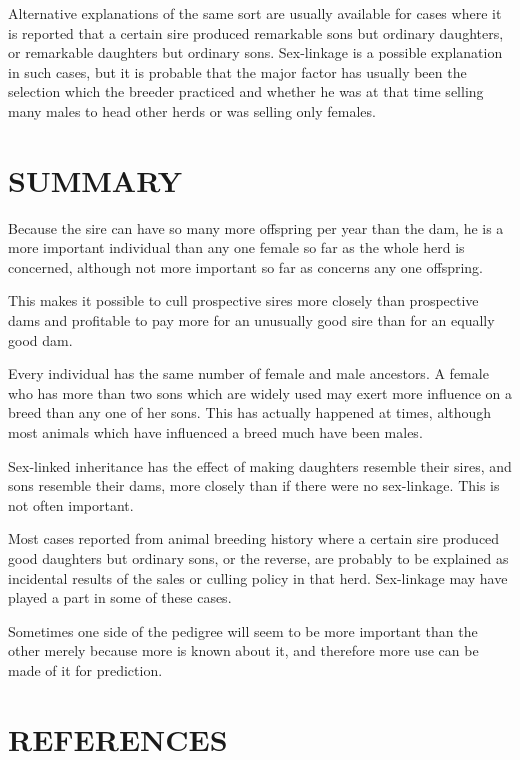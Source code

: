 Alternative explanations of the same sort are usually available for
cases where it is reported that a certain sire produced remarkable sons
but ordinary daughters, or remarkable daughters but ordinary sons.
Sex-linkage is a possible explanation in such cases, but it is probable
that the major factor has usually been the selection which the breeder
practiced and whether he was at that time selling many males to head
other herds or was selling only females.

\section*{SUMMARY}

Because the sire can have so many more offspring per year than the
dam, he is a more important individual than any one female so far as
the whole herd is concerned, although not more important so far as
concerns any one offspring.

This makes it possible to cull prospective sires more closely than
prospective dams and profitable to pay more for an unusually good sire
than for an equally good dam.

Every individual has the same number of female and male ancestors.
A female who has more than two sons which are widely used may exert
more influence on a breed than any one of her sons. This has actually
happened at times, although most animals which have influenced a
breed much have been males.

Sex-linked inheritance has the effect of making daughters resemble
their sires, and sons resemble their dams, more closely than if there were
no sex-linkage. This is not often important.

Most cases reported from animal breeding history where a certain
sire produced good daughters but ordinary sons, or the reverse, are
probably to be explained as incidental results of the sales or culling
policy in that herd. Sex-linkage may have played a part in some of these
cases.

\nowidow
Sometimes one side of the pedigree will seem to be more important
than the other merely because more is known about it, and therefore
more use can be made of it for prediction.

\section*{REFERENCES}


